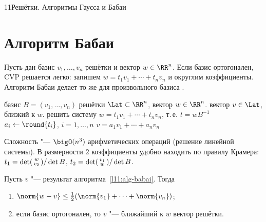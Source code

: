 \begin{lecture}{11}{Решётки. Алгоритмы Гаусса и Бабаи}


\section{Алгоритм Бабаи}

Пусть дан базис $v_1, \dots, v_n$ решётки и вектор $w \in \RR^n$. Если базис ортогонален,
CVP решается легко: запишем $w = t_1 v_1 + \cdots + t_n v_n$ и округлим коэффициенты.
Алгоритм Бабаи делает то же для произвольного базиса \cite{babai}.

\begin{algorithm}\label{l11:alg-babai}
\begin{algorithmic}[1]
\Require базис $B = (v_1, \dots, v_n)$ решётки $\Lat \subset \RR^n$, вектор $w \in \RR^n$.
\Ensure вектор $v \in \Lat$, близкий к $w$.
\State решить систему $w = t_1 v_1 + \cdots + t_n v_n$, т.\,е. $t = wB^{-1}$
\State $a_i \gets \round{t_i}$, $i = 1, \dots, n$
\State \Return $v = a_1 v_1 + \cdots + a_n v_n$
\end{algorithmic}
\end{algorithm}

Сложность "--- $\bigO(n^3)$ арифметических операций (решение линейной системы). В размерности
$2$ коэффициенты удобно находить по правилу Крамера:
$t_1 = \det\begin{psmallmatrix} w \\ v_2\end{psmallmatrix} / \det B$,
$t_2 = \det\begin{psmallmatrix} v_1 \\ w\end{psmallmatrix} / \det B$.

\begin{proposition}\label{l11:babai-bound}
Пусть $v$ "--- результат алгоритма~\ref{l11:alg-babai}. Тогда
\begin{enumerate}
  \item $\norm{w - v} \le \frac12 (\norm{v_1} + \cdots + \norm{v_n})$;
  \item если базис ортогонален, то $v$ "--- ближайший к $w$ вектор решётки.
\end{enumerate}
\end{proposition}


\end{lecture}
